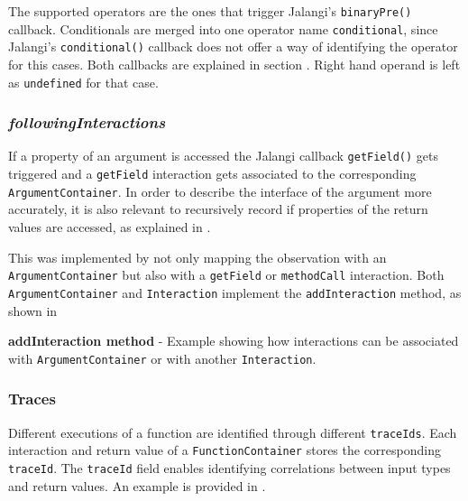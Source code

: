 The supported operators are the ones that trigger Jalangi's \texttt{binaryPre()} callback. Conditionals are merged into one operator name \texttt{conditional}, since Jalangi's \texttt{conditional()} callback does not offer a way of identifying the operator for this cases. Both callbacks are explained in section . Right hand operand is left as \texttt{undefined} for that case.



\subsubsection{\textit{followingInteractions}}
If a property of an argument is accessed the Jalangi callback \texttt{getField()} gets triggered and a \texttt{getField} interaction gets associated to the corresponding \texttt{ArgumentContainer}. In order to describe the interface of the argument more accurately, it is also relevant to recursively record if properties of the return values are accessed, as explained in .

This was implemented by not only mapping the observation with an \texttt{ArgumentContainer} but also with a \texttt{getField} or \texttt{methodCall} interaction. Both \texttt{ArgumentContainer} and \texttt{Interaction} implement the \texttt{addInteraction} method, as shown in 

\begin{code}
  \caption[addInteraction method]{\textbf{addInteraction method} - Example showing how interactions can be associated with \texttt{ArgumentContainer} or with another \texttt{Interaction}.}
  \label{code:add-interaction-example}
\end{code}



\subsubsection{Traces}
Different executions of a function are identified through different \texttt{traceIds}. Each interaction and return value of a \texttt{FunctionContainer} stores the corresponding \texttt{traceId}. The \texttt{traceId} field enables identifying correlations between input types and return values. An example is provided in .

